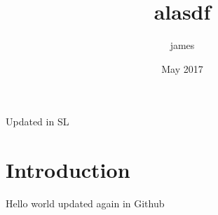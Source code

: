 \documentclass{article}
\title{alasdf}
\author{james }
\date{May 2017}
\begin{document}
\maketitle

Updated in SL

\section{Introduction}

Hello world updated again in Github
\end{document}
